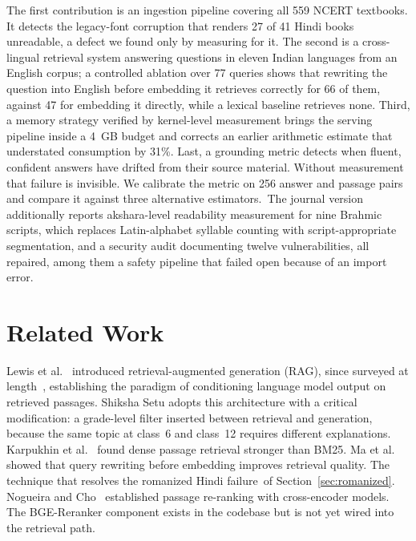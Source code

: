 The first contribution is an ingestion pipeline covering all 559 NCERT textbooks. It detects the legacy-font corruption that renders 27 of 41 Hindi books unreadable, a defect we found only by measuring for it. The second is a cross-lingual retrieval system answering questions in eleven Indian languages from an English corpus; a controlled ablation over 77 queries shows that rewriting the question into English before embedding it retrieves correctly for 66 of them, against 47 for embedding it directly, while a lexical baseline retrieves none. Third, a memory strategy verified by kernel-level measurement brings the serving pipeline inside a 4~GB budget and corrects an earlier arithmetic estimate that understated consumption by 31\%. Last, a grounding metric detects when fluent, confident answers have drifted from their source material. Without measurement that failure is invisible. We calibrate the metric on 256 answer and passage pairs and compare it against three alternative estimators.\ifconf\else\ The journal version additionally reports akshara-level readability measurement for nine Brahmic scripts, which replaces Latin-alphabet syllable counting with script-appropriate segmentation, and a security audit documenting twelve vulnerabilities, all repaired, among them a safety pipeline that failed open because of an import error.\fi

\section{Related Work}

Lewis et al.~\cite{b2} introduced retrieval-augmented generation (RAG), since surveyed at length~\cite{b28}, establishing the paradigm of conditioning language model output on retrieved passages. Shiksha Setu adopts this architecture with a critical modification: a grade-level filter inserted between retrieval and generation, because the same topic at class~6 and class~12 requires different explanations. Karpukhin et al.~\cite{b3} found dense passage retrieval stronger than BM25. Ma et al.~\cite{b4} showed that query rewriting before embedding improves retrieval quality. The technique that resolves the romanized Hindi failure\ifconf\else\ of Section~\ref{sec:romanized}\fi. Nogueira and Cho~\cite{b5} established passage re-ranking with cross-encoder models. The BGE-Reranker component exists in the codebase but is not yet wired into the retrieval path.

